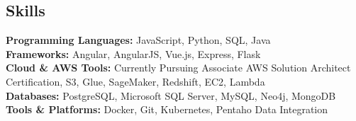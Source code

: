 \documentclass[margin, 10pt]{res} %
\begin{document}
\begin{resume}
\section{Skills}
\textbf{Programming Languages:} JavaScript, Python, SQL, Java \\
\textbf{Frameworks:} Angular, AngularJS, Vue.js, Express, Flask \\
\textbf{Cloud \& AWS Tools:}  Currently Pursuing Associate AWS Solution Architect Certification, S3, Glue, SageMaker, Redshift, EC2, Lambda \\
\textbf{Databases:} PostgreSQL, Microsoft SQL Server, MySQL, Neo4j, MongoDB \\
\textbf{Tools \& Platforms:} Docker, Git, Kubernetes, Pentaho Data Integration
\end{resume}
\end{document}
